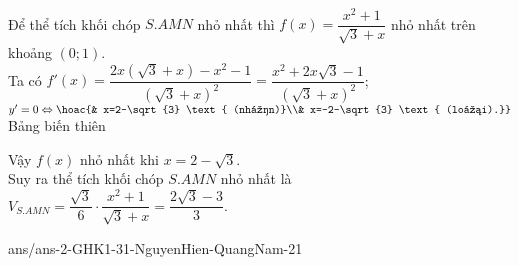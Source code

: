 \begin{ex}
{\begin{eqnarray*}
		\end{eqnarray*}
		Để thể tích khối chóp $S.AMN$ nhỏ nhất thì $f(x)=\dfrac{x^2+1}{\sqrt{3}+x}$ nhỏ nhất trên khoảng $(0;1)$.\\
		Ta có $f'(x)=\dfrac{2x(\sqrt{3}+x)-x^2-1}{(\sqrt{3}+x)^2}=\dfrac{x^2+2x\sqrt{3}-1}{(\sqrt{3}+x)^2}$; $y'=0 \Leftrightarrow \hoac{& x=2-\sqrt{3} \text{ (nhận)}\\& x=-2-\sqrt{3} \text{ (loại).}}$\\
		Bảng biến thiên
		\begin{center}
		\end{center}
		Vậy $f(x)$ nhỏ nhất khi $x=2-\sqrt{3}$.\\
		Suy ra thể tích khối chóp $S.AMN$ nhỏ nhất là $V_{S.AMN}=\dfrac{\sqrt{3}}{6}\cdot \dfrac{x^2+1}{\sqrt{3}+x}=\dfrac{2\sqrt{3}-3}{3}$.
	}
\end{ex}

\begin{indapan}{10}
	{ans/ans-2-GHK1-31-NguyenHien-QuangNam-21}
\end{indapan}

